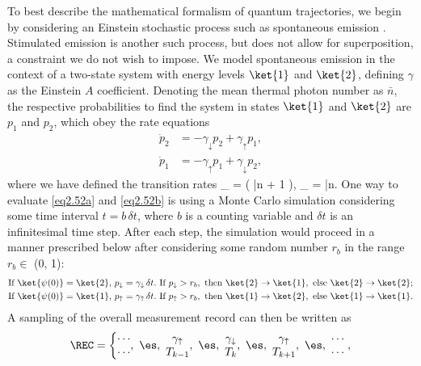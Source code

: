 To best describe the mathematical formalism of quantum trajectories, we begin by considering an Einstein stochastic process such as spontaneous emission \cite{howard2}. Stimulated emission is another such process, but does not allow for superposition, a constraint we do not wish to impose. We model spontaneous emission in the context of a two-state system with energy levels $\ket{1}$ and $\ket{2}$, defining $\gamma$ as the Einstein $A$ coefficient. Denoting the mean thermal photon number as $\bar{n}$, the respective probabilities to find the system in states $\ket{1}$ and $\ket{2}$ are $p_1$ and $p_2$, which obey the rate equations
%
\begin{subequations} \begin{align} 
\dot{p}_2 &= -\gamma_{\downarrow} p_2 + \gamma_{\uparrow} p_1, \label{eq2.52a} \\
\dot{p}_1 &= -\gamma_{\uparrow} p_1 + \gamma_{\downarrow} p_2, \label{eq2.52b} \end{align} \end{subequations}
%
where we have defined the transition rates
%
\be \gamma_{\downarrow} = \gamma \left( \bar{n} + 1 \right), \quad \gamma_{\uparrow} = \gamma \bar{n}. \label{eq2.53} \ee
%
One way to evaluate \eqref{eq2.52a} and \eqref{eq2.52b} is using a Monte Carlo simulation considering some time interval $t = b \, \delta t$, where $b$ is a counting variable and $\delta t$ is an infinitesimal time step. After each step, the simulation would proceed in a manner prescribed below after considering some random number $r_b$ in the range $r_b \in$ (0, 1):
%
\begin{subequations} \begin{align}
&\text{If } \ket{\psi(0)} = \ket{2}, \, p_{\downarrow} = \gamma_{\downarrow} \, \delta t. \text{ If } p_{\downarrow} > r_b, \text{ then } \ket{2} \to \ket{1}, \text{ else } \ket{2} \to \ket{2}; \label{eq2.54a} \\
&\text{If } \ket{\psi(0)} = \ket{1}, \, p_{\uparrow} = \gamma_{\uparrow} \, \delta t. \text{ If } p_{\uparrow} > r_b, \text{ then } \ket{1} \to \ket{2}, \text{ else } \ket{1} \to \ket{1}. \label{eq2.54b} \end{align} \end{subequations}
%
A sampling of the overall measurement record can then be written as
%
\[ \REC = \left\{ \begin{matrix} \cdots \\ \cdots \end{matrix}, \ \es, \ \begin{matrix} \gamma_{\uparrow} \\ T_{k-1} \end{matrix}, \ \es, \ \begin{matrix} \gamma_{\downarrow} \\ T_k \end{matrix}, \ \es, \ \begin{matrix} \gamma_{\uparrow} \\ T_{k+1} \end{matrix}, \ \es, \ \begin{matrix} \cdots \\ \cdots \end{matrix} \right. , \]
